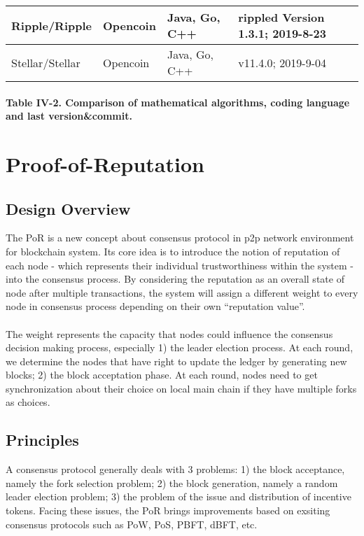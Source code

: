 \documentclass[]{article}
\begin{document}
\begin{CJK*}{UTF8}{gbsn}
\begin{tabular}{p{2cm}p{3cm}p{3cm}p{3cm}}
Ripple/Ripple & Opencoin & Java, Go, C++ & rippled Version 1.3.1; 2019-8-23 \\ \hline

Stellar/Stellar & Opencoin & Java, Go, C++ & v11.4.0; 2019-9-04 \\ \hline
\end{tabular}
\paragraph{Table IV-2. Comparison of mathematical algorithms, coding language and last version\&commit.}


\section{Proof-of-Reputation}
\renewcommand\thesubsection{\Roman{section}.\arabic{subsection}}
\subsection{Design Overview}
The PoR is a new concept about consensus protocol in p2p network environment for blockchain system. Its core idea is to introduce the notion of reputation of each node - which represents their individual trustworthiness within the system -  into the consensus process. By considering the reputation as an overall state of node after multiple transactions, the system will assign a different weight to every node  in consensus process depending on their own ``reputation value''. 
\paragraph{} The weight represents the capacity that nodes could influence the consensus decision making process, especially 1) the leader election process. At each round, we determine the nodes that have right to update the ledger by generating new blocks; 2) the block acceptation phase. At each round, nodes need to get synchronization about their choice on local main chain if they have multiple forks as choices.

\subsection{Principles}
A consensus protocol generally deals with 3 problems: 1) the block acceptance, namely the fork selection problem; 2) the block generation, namely a random leader election problem; 3) the problem of the issue and distribution of incentive tokens. Facing these issues, the PoR brings improvements based on exsiting consensus protocols such as PoW, PoS, PBFT, dBFT, etc.

\end{CJK*}
\end{document}

